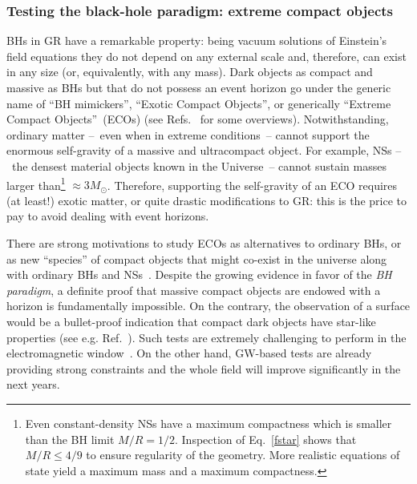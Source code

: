 \documentclass[11pt]{article}
\numberwithin{equation}{section} %
\begin{document}
\subsubsection{Testing the black-hole paradigm: extreme compact objects} \label{sec:BHmimickers}
BHs in GR have a remarkable property: being vacuum solutions of Einstein's field equations they do not depend on any external scale and, therefore, can exist in any size (or, equivalently, with any mass).
%
Dark objects as compact and massive as BHs but that do not possess an event horizon go under the generic name of ``BH 
mimickers'', ``Exotic Compact Objects'', or generically ``Extreme Compact 
Objects''~(ECOs) (see Refs.~\cite{Cardoso:2017cqb,Cardoso:2019rvt,Carballo-Rubio:2018jzw} for some overviews).
%
Notwithstanding, ordinary matter 
--~even when in extreme conditions~-- cannot support the enormous self-gravity of a massive and ultracompact object. 
For example, NSs --~the densest material objects known in the Universe~-- cannot sustain masses larger 
than\footnote{Even constant-density NSs have a maximum compactness which is smaller than the BH limit $M/R=1/2$. 
Inspection of Eq.~\eqref{fstar} shows that $M/R\leq 4/9$ to ensure regularity of the geometry. More realistic equations 
of state yield a maximum mass and a maximum compactness.} $\approx 3M_{\odot}$. Therefore, supporting the self-gravity 
of an ECO requires (at least!) exotic matter, or quite drastic modifications to GR: this is the price to pay to avoid 
dealing with event horizons.


There are strong motivations to study ECOs as alternatives to ordinary 
BHs, or as new ``species'' of compact objects that might co-exist in the universe along with ordinary BHs and 
NSs~\cite{Cardoso:2017cqb,Cardoso:2019rvt}. Despite the growing evidence in favor of the \emph{BH paradigm}, a definite 
proof that massive compact objects are endowed with a horizon is fundamentally impossible. On the contrary, the 
observation of a surface would be a bullet-proof indication that compact dark objects have 
star-like properties (see e.g. Ref.~\cite{Narayan:2005ie}). Such tests are extremely challenging to 
perform in the electromagnetic window~\cite{Abramowicz:2002vt,Cardoso:2017cqb,Cardoso:2019rvt}.
On the other hand, GW-based tests are already providing strong constraints and the whole field will improve 
significantly in the next years.
%


\end{document}
